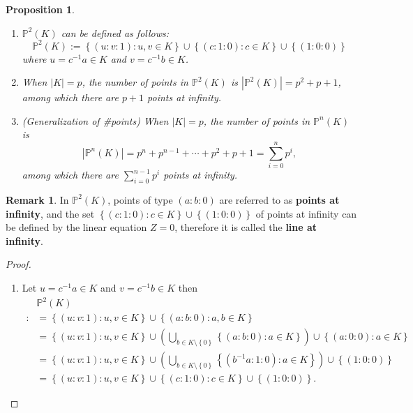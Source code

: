 \documentclass[12pt,openany]{book}
\newtheorem{proposition}[theorem]{Proposition}
\theoremstyle{definition}
\newtheorem{remark}{Remark}[chapter]
\newcommand{\set}[1]{\left\{#1\right\}}
\newcommand{\of}[1]{\left( #1 \right)}
\newcommand{\abs}[1]{\left\lvert #1 \right\rvert}
\begin{document}
	\vspace{8pt}
	\begin{tcolorbox}[colback=white,colframe=procolor,arc=5pt,title={\color{white}\bf }]
		\begin{proposition}
			\ \begin{enumerate}[(1)]
				\item $\mathbb{P}^2(K)$ can be defined as follows: \[
				\mathbb{P}^2(K):=\set{(u:v:1):u,v\in K}\cup\set{(c:1:0):c\in K}\cup\set{(1:0:0)}
				\] where $u=c^{-1}a\in K$ and $v=c^{-1}b\in K$.
				\item When $\abs{K}=p$, the number of points in $\mathbb{P}^2(K)$ is $\abs{\mathbb{P}^2(K)}=p^2+p+1$, among which there are $p+1$ points at infinity.
				\item (Generalization of \#points) When $\abs{K}=p$, the number of points in $\mathbb{P}^n(K)$ is \[
				\abs{\mathbb{P}^n(K)}=p^n+p^{n-1}+\cdots+p^2+p+1=\sum_{i=0}^np^i,
				\] among which there are $\sum_{i=0}^{n-1}p^i$ points at infinity.
			\end{enumerate}
		\end{proposition}
	\end{tcolorbox}
	\begin{remark}
		In $\mathbb{P}^2(K)$, points of type $(a:b:0)$ are referred to as \textbf{points at infinity}, and the set $\set{(c:1:0):c\in K}\cup\set{(1:0:0)}$ of points at infinity can be defined by the linear equation $Z=0$, therefore it is called the \textbf{line at infinity}.
	\end{remark}
	\begin{proof}
		\begin{enumerate}[(1)]
			\item Let $u=c^{-1}a\in K$ and $v=c^{-1}b\in K$ then \begin{align*}
			&\mathbb{P}^2(K)\\
			:&=\set{(u:v:1):u,v\in K}\cup\set{(a:b:0):a,b\in K}\\
			&=\set{(u:v:1):u,v\in K}\cup\of{\bigcup_{b\in K\setminus\set{0}}\set{(a:b:0):a\in K}}\cup\set{(a:0:0):a\in K}\\
			&=\set{(u:v:1):u,v\in K}\cup\of{\bigcup_{b\in K\setminus\set{0}}\set{(b^{-1}a:1:0):a\in K}}\cup\set{(1:0:0)}\\
			&=\set{(u:v:1):u,v\in K}\cup\set{(c:1:0):c\in K}\cup\set{(1:0:0)}.
			\end{align*}
		\end{enumerate}
	\end{proof}
	\vspace{4pt}
\end{document}
